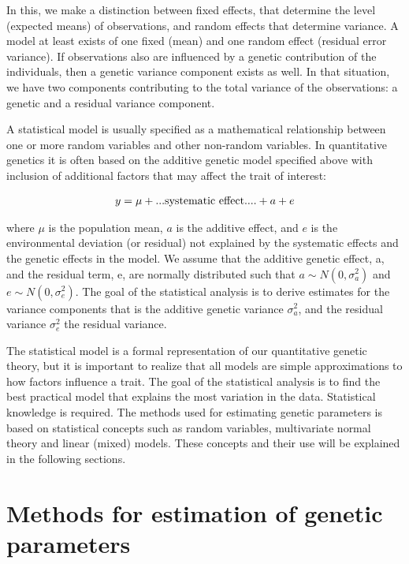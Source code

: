 \documentclass[
]{book}
\begin{document}
In this, we make a distinction between fixed effects, that determine the level (expected means) of observations, and
random effects that determine variance. A model at least exists of one fixed (mean)
and one random effect (residual error variance). If observations also are influenced by a
genetic contribution of the individuals, then a genetic variance component exists as well. In
that situation, we have two components contributing to the total variance of the
observations: a genetic and a residual variance component.

A statistical model is usually specified as a mathematical relationship between one or more random variables and other non-random variables. In quantitative genetics it is often based on the additive genetic model specified above with inclusion of additional factors that may affect the trait of interest:

\begin{align}
            y=\mu + \text{...systematic effect....} + a + e  \notag
\end{align}

where \(\mu\) is the population mean, \(a\) is the additive effect, and \(e\) is the environmental deviation (or residual) not explained by the systematic effects and the genetic effects in the model. We assume that the additive genetic effect, a, and the residual term, e, are normally distributed such that \(a \sim N(0,\sigma^2_{a})\) and \(e \sim N(0,\sigma^2_{e})\). The goal of the statistical analysis is to derive estimates for the variance components that is the additive genetic variance \(\sigma^2_{a}\), and the residual variance \(\sigma^2_{e}\) the residual variance.

The statistical model is a formal representation of our quantitative genetic theory, but it is important to realize that all models are simple approximations to how factors influence a trait. The goal of the statistical analysis is to find the best practical model that explains the most variation in the data. Statistical knowledge is required. The methods used for estimating genetic parameters is based on statistical concepts such as random variables, multivariate normal theory and linear (mixed) models. These concepts and their use will be explained in the following sections.

\hypertarget{methods-for-estimation-of-genetic-parameters}{%
\chapter{Methods for estimation of genetic parameters}\label{methods-for-estimation-of-genetic-parameters}}
\end{document}

